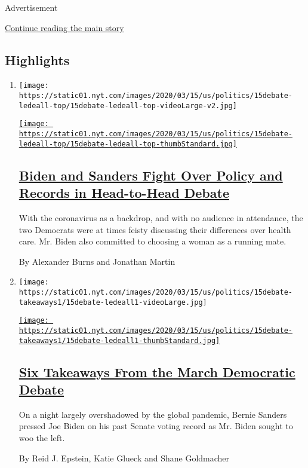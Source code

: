 Advertisement

\protect\hyperlink{after-subheader}{Continue reading the main story}

\hypertarget{highlights}{%
\subsection{Highlights}\label{highlights}}

\begin{enumerate}
\def\labelenumi{\arabic{enumi}.}
\item
  \texttt{[image: https://static01.nyt.com/images/2020/03/15/us/politics/15debate-ledeall-top/15debate-ledeall-top-videoLarge-v2.jpg]}

  \href{/2020/03/15/us/politics/biden-sanders-debate-recap.html}{\texttt{[image: https://static01.nyt.com/images/2020/03/15/us/politics/15debate-ledeall-top/15debate-ledeall-top-thumbStandard.jpg]}}

  \hypertarget{biden-and-sanders-fight-over-policy-and-records-in-head-to-head-debate}{%
  \subsection{\texorpdfstring{\href{/2020/03/15/us/politics/biden-sanders-debate-recap.html}{Biden
  and Sanders Fight Over Policy and Records in Head-to-Head
  Debate}}{Biden and Sanders Fight Over Policy and Records in Head-to-Head Debate}}\label{biden-and-sanders-fight-over-policy-and-records-in-head-to-head-debate}}

  With the coronavirus as a backdrop, and with no audience in
  attendance, the two Democrats were at times feisty discussing their
  differences over health care. Mr. Biden also committed to choosing a
  woman as a running mate.

  By Alexander Burns and Jonathan Martin
\item
  \texttt{[image: https://static01.nyt.com/images/2020/03/15/us/politics/15debate-takeaways1/15debate-ledeall1-videoLarge.jpg]}

  \href{/2020/03/16/us/politics/takeaways-march-democratic-debate.html}{\texttt{[image: https://static01.nyt.com/images/2020/03/15/us/politics/15debate-takeaways1/15debate-ledeall1-thumbStandard.jpg]}}

  \hypertarget{six-takeaways-from-the-march-democratic-debate}{%
  \subsection{\texorpdfstring{\href{/2020/03/16/us/politics/takeaways-march-democratic-debate.html}{Six
  Takeaways From the March Democratic
  Debate}}{Six Takeaways From the March Democratic Debate}}\label{six-takeaways-from-the-march-democratic-debate}}

  On a night largely overshadowed by the global pandemic, Bernie Sanders
  pressed Joe Biden on his past Senate voting record as Mr. Biden sought
  to woo the left.

  By Reid J. Epstein, Katie Glueck and Shane Goldmacher
\end{enumerate}

